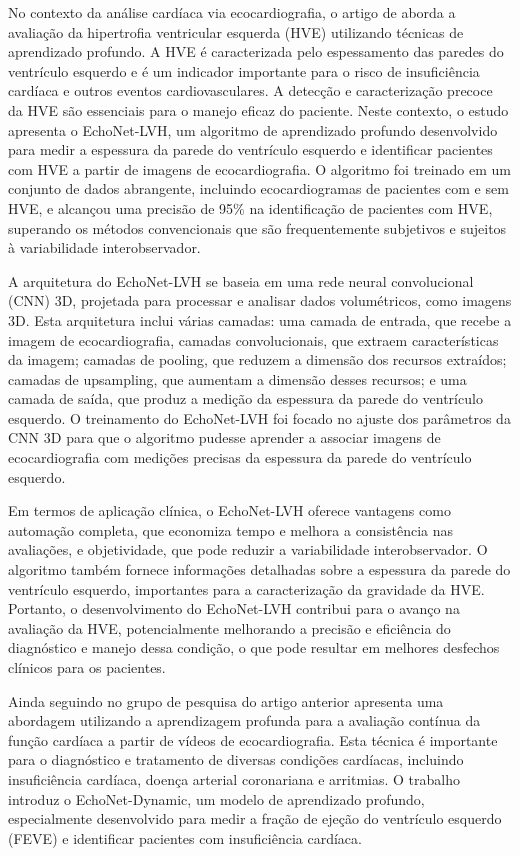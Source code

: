  No contexto da análise cardíaca via ecocardiografia, o artigo de \textcite{10.1001/jamacardio.2021.6059} aborda a avaliação da hipertrofia ventricular esquerda (HVE) utilizando técnicas de aprendizado profundo. A HVE é caracterizada pelo espessamento das paredes do ventrículo esquerdo e é um indicador importante para o risco de insuficiência cardíaca e outros eventos cardiovasculares. A detecção e caracterização precoce da HVE são essenciais para o manejo eficaz do paciente. Neste contexto, o estudo apresenta o EchoNet-LVH, um algoritmo de aprendizado profundo desenvolvido para medir a espessura da parede do ventrículo esquerdo e identificar pacientes com HVE a partir de imagens de ecocardiografia. O algoritmo foi treinado em um conjunto de dados abrangente, incluindo ecocardiogramas de pacientes com e sem HVE, e alcançou uma precisão de 95\% na identificação de pacientes com HVE, superando os métodos convencionais que são frequentemente subjetivos e sujeitos à variabilidade interobservador.

A arquitetura do EchoNet-LVH se baseia em uma rede neural convolucional (CNN) 3D, projetada para processar e analisar dados volumétricos, como imagens 3D. Esta arquitetura inclui várias camadas: uma camada de entrada, que recebe a imagem de ecocardiografia, camadas convolucionais, que extraem características da imagem; camadas de pooling, que reduzem a dimensão dos recursos extraídos; camadas de upsampling, que aumentam a dimensão desses recursos; e uma camada de saída, que produz a medição da espessura da parede do ventrículo esquerdo. O treinamento do EchoNet-LVH foi focado no ajuste dos parâmetros da CNN 3D para que o algoritmo pudesse aprender a associar imagens de ecocardiografia com medições precisas da espessura da parede do ventrículo esquerdo.

Em termos de aplicação clínica, o EchoNet-LVH oferece vantagens como automação completa, que economiza tempo e melhora a consistência nas avaliações, e objetividade, que pode reduzir a variabilidade interobservador. O algoritmo também fornece informações detalhadas sobre a espessura da parede do ventrículo esquerdo, importantes para a caracterização da gravidade da HVE. Portanto, o desenvolvimento do EchoNet-LVH contribui para o avanço na avaliação da HVE, potencialmente melhorando a precisão e eficiência do diagnóstico e manejo dessa condição, o que pode resultar em melhores desfechos clínicos para os pacientes.


Ainda seguindo no grupo de pesquisa do artigo anterior \textcite{Ouyang2020} apresenta uma abordagem utilizando a aprendizagem profunda para a avaliação contínua da função cardíaca a partir de vídeos de ecocardiografia. Esta técnica é importante para o diagnóstico e tratamento de diversas condições cardíacas, incluindo insuficiência cardíaca, doença arterial coronariana e arritmias. O trabalho introduz o EchoNet-Dynamic, um modelo de aprendizado profundo, especialmente desenvolvido para medir a fração de ejeção do ventrículo esquerdo (FEVE) e identificar pacientes com insuficiência cardíaca. 

